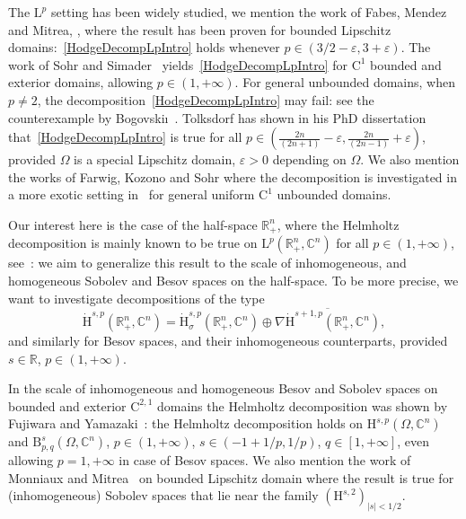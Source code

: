 \documentclass[AHL,Unicode,longabstracts,published]{cedram}
\newcommand{\bbR}{\mathbb{R}}
\newcommand{\bbC}{\mathbb{C}}
\newcommand{\rmH}{\mathrm{H}}%
\newcommand{\rmB}{\mathrm{B}}
\newcommand{\rmL}{\mathrm{L}}
\newcommand{\rmC}{\mathrm{C}}
\begin{document}
The $\rmL^p$ setting has been widely studied, we mention the work of Fabes, Mendez and Mitrea, \cite[Theorem~12.2]{FabesMendezMitrea1998}, where the result has been proven for bounded Lipschitz domains:~\eqref{HodgeDecompLpIntro} holds whenever $p\in (3/2-\varepsilon,3+\varepsilon)$. The work of Sohr and Simader~\cite[Theorem~1.4]{SimaderSohr1992} yields~\eqref{HodgeDecompLpIntro} for $\rmC^1$ bounded and exterior domains, allowing $p\in(1,+\infty)$. For general unbounded domains, when $p\neq 2$, the decomposition~\eqref{HodgeDecompLpIntro} may fail: see the counterexample by Bogovski\i~\cite[Section~2]{Bogovskii1986}. Tolksdorf has shown in his PhD dissertation~\cite[Theorem~5.1.10]{TolksdorfPhDThesis2017} that~\eqref{HodgeDecompLpIntro} is true for all $p\in(\tfrac{2n}{(2n+1)}-\varepsilon,\tfrac{2n}{(2n-1)}+\varepsilon)$, provided $\Omega$ is a special Lipschitz domain, $\varepsilon>0$ depending on $\Omega$. We also mention the works of Farwig, Kozono and Sohr where the decomposition is investigated in a more exotic setting in~\cite{FarwigKozonoSohr2005,FarwigKozonoSohr2007} for general uniform $\rmC^1$ unbounded domains.


Our interest here is the case of the half-space $\bbR^n_+$, where the Helmholtz decomposition is mainly known to be true on $\rmL^p(\bbR^n_+,\bbC^n)$ for all $p\in(1,+\infty)$, see~\cite[Remark~III.1.2]{bookGaldi2011}: we aim to generalize this result to the scale of inhomogeneous, and homogeneous Sobolev and Besov spaces on the half-space. To be more precise, we want to investigate decompositions of the type
\begin{equation}\label{eq:HelmholtzDecompHspIntro}
\dot{\rmH}^{s,p}\left(\bbR^n_+,\bbC^n\right) = \dot{\rmH}^{s,p}_{\sigma}\left(\bbR^n_+,\bbC^n\right) \oplus \overline{\nabla \dot{\rmH}^{s+1,p}\left(\bbR^n_+,\bbC^n\right)},
\end{equation}
and similarly for Besov spaces, and their inhomogeneous counterparts, provided $s\in\bbR$, $p\in(1,+\infty)$.

In the scale of inhomogeneous and homogeneous Besov and Sobolev spaces on bounded and exterior $\rmC^{2,1}$ domains the Helmholtz decomposition was shown by Fujiwara and Yamazaki~\cite[Theorem~3.1]{FujiwaraYamazaki2007}: the Helmholtz decomposition holds on $\rmH^{s,p}(\Omega,\bbC^n)$ and $\rmB^{s}_{p,q}(\Omega,\bbC^n)$, $p\in (1,+\infty)$, $s\in(-1+1/p,1/p)$, $q\in[1,+\infty]$, even allowing $p=1,+\infty$ in case of Besov spaces. We also mention the work of Monniaux and Mitrea~\cite[Proposition~2.16]{MitreaMonniaux2008} on bounded Lipschitz domain where the result is true for (inhomogeneous) Sobolev spaces that lie near the family $(\rmH^{s,2})_{|s|<1/2}$.
\end{document}
